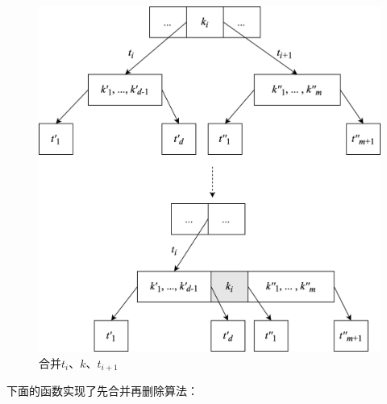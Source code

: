 \documentclass{ctexart}
\begin{document}
\begin{figure}[htbp]
  \centering
  \includegraphics[scale=0.65]{img/btree-del-merge-subtree.png}
  \caption{合并$t_i$、$k$、$t_{i+1}$}
  \label{fig:btree-del-merge-subtree}
\end{figure}

下面的函数实现了先合并再删除算法：
\end{document}
